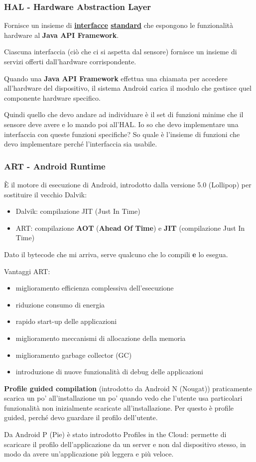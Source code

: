 \subsubsection{HAL - Hardware Abstraction Layer}
\par Fornisce un insieme di \textbf{\underline{interfacce} \underline{standard}} che espongono le funzionalità hardware al \textbf{Java API Framework}.
\par Ciascuna interfaccia (ciò che ci si aspetta dal sensore) fornisce un insieme di servizi offerti dall'hardware corrispondente.
\par Quando una \textbf{Java API Framework} effettua una chiamata per accedere all'hardware del dispositivo, il sistema Android carica il modulo che gestisce quel componente hardware specifico.
\par Quindi quello che devo andare ad individuare è il set di funzioni minime che il sensore deve avere e lo mando poi all'HAL. Io so che devo implementare una interfaccia con queste funzioni specifiche? So quale è l'insieme di funzioni che devo implementare perché l'interfaccia sia usabile.

\subsubsection{ART - Android Runtime}
\par \`E il motore di esecuzione di Android, introdotto dalla versione 5.0 (Lollipop) per sostituire il vecchio Dalvik:
\begin{itemize}
    \item Dalvik: compilazione JIT (Just In Time)
    \item ART: compilazione \textbf{AOT} (\textbf{Ahead Of Time}) e \textbf{JIT} (compilazione Just In Time)
\end{itemize}
\par Dato il bytecode che mi arriva, serve qualcuno che lo compili \textbf{e} lo esegua.
\par Vantaggi ART:
\begin{itemize}
    \item miglioramento efficienza complessiva dell'esecuzione
    \item riduzione consumo di energia
    \item rapido start-up delle applicazioni
    \item miglioramento meccanismi di allocazione della memoria
    \item miglioramento garbage collector (GC)
    \item introduzione di nuove funzionalità di debug delle applicazioni
\end{itemize}
\par \textbf{Profile guided compilation} (introdotto da Android N (Nougat)) praticamente scarica un po' all'installazione un po' quando vedo che l'utente usa particolari funzionalità non inizialmente scaricate all'installazione. Per questo è profile guided, perché devo guardare il profilo dell'utente.
\par Da Android P (Pie) è stato introdotto Profiles in the Cloud: permette di scaricare il profilo dell'applicazione da un server e non dal dispositivo stesso, in modo da avere un'applicazione più leggera e più veloce.

